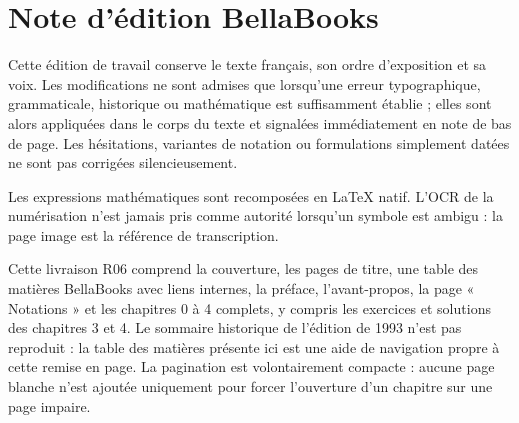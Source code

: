 \chapter*{Note d'édition BellaBooks}
\small
Cette édition de travail conserve le texte français, son ordre d'exposition et sa voix. Les modifications ne sont admises que lorsqu'une erreur typographique, grammaticale, historique ou mathématique est suffisamment établie ; elles sont alors appliquées dans le corps du texte et signalées immédiatement en note de bas de page. Les hésitations, variantes de notation ou formulations simplement datées ne sont pas corrigées silencieusement.

Les expressions mathématiques sont recomposées en LaTeX natif. L'OCR de la numérisation n'est jamais pris comme autorité lorsqu'un symbole est ambigu : la page image est la référence de transcription.

Cette livraison R06 comprend la couverture, les pages de titre, une table des matières BellaBooks avec liens internes, la préface, l'avant-propos, la page « Notations » et les chapitres 0 à 4 complets, y compris les exercices et solutions des chapitres 3 et 4. Le sommaire historique de l'édition de 1993 n'est pas reproduit : la table des matières présente ici est une aide de navigation propre à cette remise en page. La pagination est volontairement compacte : aucune page blanche n'est ajoutée uniquement pour forcer l'ouverture d'un chapitre sur une page impaire.
